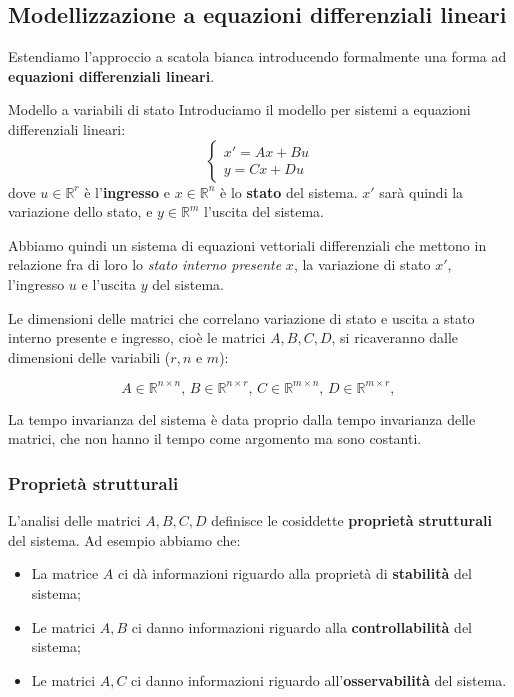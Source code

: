 \documentclass[a4paper,11pt]{article}
\begin{document}
\subsection{Modellizzazione a equazioni differenziali lineari}
Estendiamo l'approccio a scatola bianca introducendo formalmente una forma ad \textbf{equazioni differenziali lineari}.

\begin{definition}{Modello a variabili di stato}
	Introduciamo il modello per sistemi a equazioni differenziali lineari:
	\[
		\begin{cases}
			x' = Ax + Bu \\ 
			y = Cx + Du
		\end{cases}
	\]
	dove $u \in \mathbb{R}^r$ è l'\textbf{ingresso} e $x \in \mathbb{R}^n$ è lo \textbf{stato} del sistema.
	$x'$ sarà quindi la variazione dello stato, e $y \in \mathbb{R}^m$ l'uscita del sistema.
\end{definition}

Abbiamo quindi un sistema di equazioni vettoriali differenziali che mettono in relazione fra di loro lo \textit{stato interno presente} $x$, la variazione di stato $x'$, l'ingresso $u$ e l'uscita $y$ del sistema.

Le dimensioni delle matrici che correlano variazione di stato e uscita a stato interno presente e ingresso, cioè le matrici $A, B, C, D$, si ricaveranno dalle dimensioni delle variabili ($r, n$ e $m$):

$$
A \in \mathbb{R}^{n \times n}, \, 
B \in \mathbb{R}^{n \times r}, \, 
C \in \mathbb{R}^{m \times n}, \, 
D \in \mathbb{R}^{m \times r}, \, 
$$

La tempo invarianza del sistema è data proprio dalla tempo invarianza delle matrici, che non hanno il tempo come argomento ma sono costanti.

\subsubsection{Proprietà strutturali}
L'analisi delle matrici $A, B, C, D$ definisce le cosiddette \textbf{proprietà strutturali} del sistema.
Ad esempio abbiamo che:
\begin{itemize}
	\item La matrice $A$ ci dà informazioni riguardo alla proprietà di \textbf{stabilità} del sistema;
	\item Le matrici $A, B$ ci danno informazioni riguardo alla \textbf{controllabilità} del sistema;
	\item Le matrici $A, C$ ci danno informazioni riguardo all'\textbf{osservabilità} del sistema.
\end{itemize}
\end{document}
